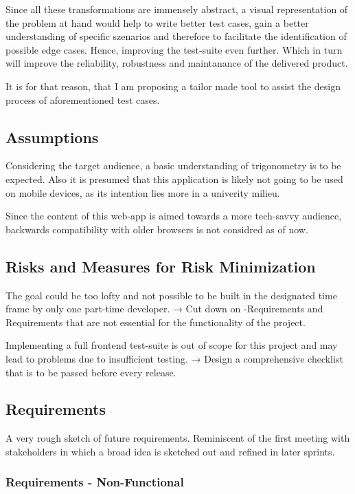 Since all these transformations are immensely abstract, a visual representation of the problem at hand would help to write better test cases, gain a better understanding of specific szenarios and therefore to facilitate the identification of possible edge cases. Hence, improving the test-suite even further. Which in turn will improve the reliability, robustness and maintanance of the delivered product.

It is for that reason, that I am proposing a tailor made tool to assist the design process of aforementioned test cases.

\subsection{Assumptions}
Considering the target audience, a basic understanding of trigonometry is to be expected. Also it is  presumed that this application is likely not going to be used on mobile devices, as its intention lies more in a univerity milieu.

Since the content of this web-app is aimed towards a more tech-savvy audience, backwards compatibility with older browsers is not considred as of now.

\subsection{Risks and Measures for Risk Minimization}
The goal could be too lofty and not possible to be built in the designated time frame by only one part-time developer. → Cut down on 
-Requirements and Requirements that are not essential for the functionality of the project.

Implementing a full frontend test-suite is out of scope for this project and may lead to problems due to insufficient testing. → Design a comprehensive checklist that is to be passed before every release.

\newpage
\subsection{Requirements}
A very rough sketch of future requirements. Reminiscent of the first meeting with stakeholders in which a broad idea is sketched out and refined in later sprints.
\subsubsection{Requirements - Non-Functional}


